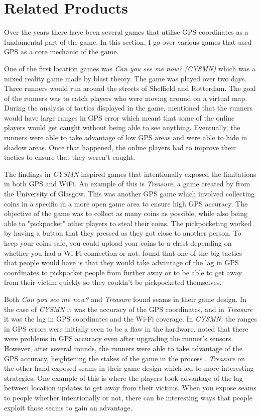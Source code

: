 \documentclass{l4proj}
\begin{document}
\section{Related Products}
\label{relatedproducts}

Over the years there have been several games that utilise GPS coordinates as a fundamental part of the game. In this section, I go over various
games that used GPS as a core mechanic of the game.

One of the first location games was \emph{Can you see me now? (CYSMN)} which was a mixed reality game made by blast theory. \citep{canyouseeme} The
game was played over two days. Three runners would run around the streets of Sheffield
and Rotterdam. The goal of the runners was to catch players who were moving around on a virtual map. During the analysis of tactics displayed in the game,
\cite{canyouseeme} mentioned that the runners would have large ranges in GPS error which meant that some of the online players would get
caught without being able to see anything. Eventually, the runners were able to take advantage of low GPS areas and were able to hide in shadow
areas. Once that happened, the online players had to improve their tactics to ensure that they weren't caught.

The findings in \emph{CYSMN} inspired games that intentionally exposed the limitations in both GPS and WiFi. An example of this 
is \emph{Treasure}, a game created by \cite{Barkhuus2005} from the University of Glasgow. This was another GPS game which involved
collecting coins in a specific in a more open game area to ensure high GPS accuracy. The objective of the
game was to collect as many coins as possible, while also being able to "pickpocket" other players to steal their
coins. The pickpocketing worked by having a button that they pressed as they got close to another person. To keep your coins safe, you could upload your coins to a chest depending on whether you had a Wi-Fi connection or not. \cite{Barkhuus2005}
found that one of the big tactics that people would have is that they would take advantage of the lag in GPS coordinates
to pickpocket people from further away or to be able to get away from their victim quickly so they couldn't be
pickpocketed themselves.

Both \emph{Can you see me now?} and \emph{Treasure} found seams in their game design. In the case of \emph{CYSMN} it was the accuracy
of the GPS coordinates, and in \emph{Treasure} it was the lag in GPS coordinates and the Wi-Fi coverage. In \emph{CYSMN}, the ranges in GPS errors were initially seen
to be a flaw in the hardware. \cite{canyouseeme} noted that there were problems in GPS accuracy even after upgrading the runner's sensors. However, after several rounds, the runners were able to take advantage of the GPS accuracy,
heightening the stakes of the game in the process \citep{canyouseeme}. \emph{Treasure} on the other hand exposed seams
in their game design which led to more interesting strategies. One example of this is where the players took 
advantage of the lag between location updates to get away from their victims. \citep{Barkhuus2005} When you expose seams to people whether intentionally or not, there can
be interesting ways that people exploit those seams to gain an advantage.
\end{document}
